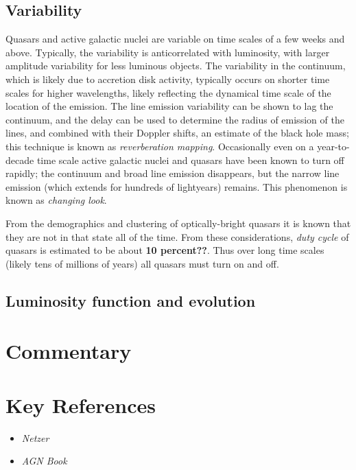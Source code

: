\subsection{Variability}

Quasars and active galactic nuclei are variable on time scales of a
few weeks and above. Typically, the variability is anticorrelated with
luminosity, with larger amplitude variability for less luminous
objects. The variability in the continuum, which is likely due to
accretion disk activity, typically occurs on shorter time scales for
higher wavelengths, likely reflecting the dynamical time scale of the
location of the emission.  The line emission variability can be shown
to lag the continuum, and the delay can be used to determine the
radius of emission of the lines, and combined with their Doppler
shifts, an estimate of the black hole mass; this technique is known as
{\it reverberation mapping}. Occasionally even on a year-to-decade
time scale active galactic nuclei and quasars have been known to turn
off rapidly; the continuum and broad line emission disappears, but the
narrow line emission (which extends for hundreds of lightyears)
remains. This phenomenon is known as {\it changing look}.

From the demographics and clustering of optically-bright quasars it is
known that they are not in that state all of the time. From these
considerations, {\it duty cycle} of quasars is estimated to be about
{\bf 10 percent??}. Thus over long time scales (likely tens of
millions of years) all quasars must turn on and off.

\subsection{Luminosity function and evolution}



\section{Commentary}

\section{Key References}

\begin{itemize}
  \item
    {\it Netzer}
  \item
    {\it AGN Book}
\end{itemize}

